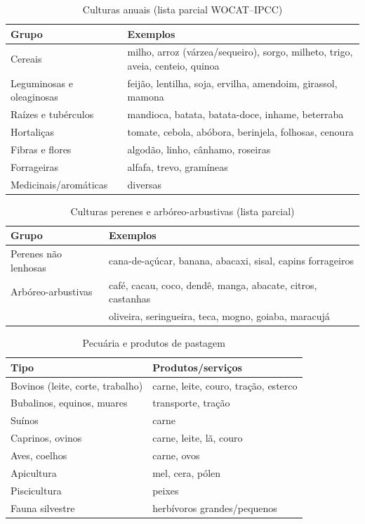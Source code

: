 \begin{table}[htbp]
\centering\small
\caption{Culturas anuais (lista parcial WOCAT--IPCC)}
\label{tab:app_annual_crops}
\begin{tabular}{ll}
\toprule
\textbf{Grupo} & \textbf{Exemplos} \\
\midrule
Cereais & milho, arroz (várzea/sequeiro), sorgo, milheto, trigo, aveia, centeio, quinoa \\
Leguminosas e oleaginosas & feijão, lentilha, soja, ervilha, amendoim, girassol, mamona \\
Raízes e tubérculos & mandioca, batata, batata-doce, inhame, beterraba \\
Hortaliças & tomate, cebola, abóbora, berinjela, folhosas, cenoura \\
Fibras e flores & algodão, linho, cânhamo, roseiras \\
Forrageiras & alfafa, trevo, gramíneas \\
Medicinais/aromáticas & diversas \\
\bottomrule
\end{tabular}
\end{table}

\begin{table}[htbp]
\centering\small
\caption{Culturas perenes e arbóreo-arbustivas (lista parcial)}
\label{tab:app_perennial_crops}
\begin{tabular}{ll}
\toprule
\textbf{Grupo} & \textbf{Exemplos} \\
\midrule
Perenes não lenhosas & cana-de-açúcar, banana, abacaxi, sisal, capins forrageiros \\
Arbóreo-arbustivas & café, cacau, coco, dendê, manga, abacate, citros, castanhas \\
& oliveira, seringueira, teca, mogno, goiaba, maracujá \\
\bottomrule
\end{tabular}
\end{table}

\begin{table}[htbp]
\centering\small
\caption{Pecuária e produtos de pastagem}
\label{tab:app_livestock}
\begin{tabular}{ll}
\toprule
\textbf{Tipo} & \textbf{Produtos/serviços} \\
\midrule
Bovinos (leite, corte, trabalho) & carne, leite, couro, tração, esterco \\
Bubalinos, equinos, muares & transporte, tração \\
Suínos & carne \\
Caprinos, ovinos & carne, leite, lã, couro \\
Aves, coelhos & carne, ovos \\
Apicultura & mel, cera, pólen \\
Piscicultura & peixes \\
Fauna silvestre & herbívoros grandes/pequenos \\
\bottomrule
\end{tabular}
\end{table}
